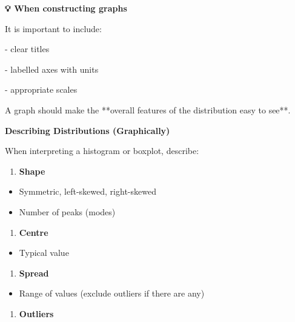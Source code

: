 \documentclass[
  11pt,
  oneside]{scrbook}
\providecommand{\tightlist}{%
  \setlength{\itemsep}{0pt}\setlength{\parskip}{0pt}}
\begin{document}
\begin{tipbox}
\textbf{💡 When constructing graphs}

It is important to include:
  
  - clear titles
  
  - labelled axes with units
  
  - appropriate scales
  
A graph should make the **overall features of the distribution easy to see**.
\end{tipbox}

\textbf{Describing Distributions (Graphically)}

When interpreting a histogram or boxplot, describe:

\begin{enumerate}
\def\labelenumi{\arabic{enumi}.}
\tightlist
\item
  \textbf{Shape}
\end{enumerate}

\begin{itemize}
\tightlist
\item
  Symmetric, left-skewed, right-skewed\\
\item
  Number of peaks (modes)
\end{itemize}

\begin{enumerate}
\def\labelenumi{\arabic{enumi}.}
\setcounter{enumi}{1}
\tightlist
\item
  \textbf{Centre}
\end{enumerate}

\begin{itemize}
\tightlist
\item
  Typical value
\end{itemize}

\begin{enumerate}
\def\labelenumi{\arabic{enumi}.}
\setcounter{enumi}{2}
\tightlist
\item
  \textbf{Spread}
\end{enumerate}

\begin{itemize}
\tightlist
\item
  Range of values (exclude outliers if there are any)
\end{itemize}

\begin{enumerate}
\def\labelenumi{\arabic{enumi}.}
\setcounter{enumi}{3}
\tightlist
\item
  \textbf{Outliers}
\end{enumerate}
\end{document}
